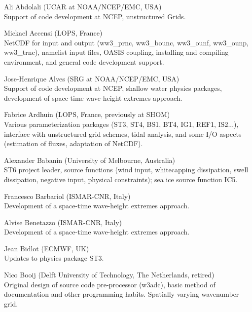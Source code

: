 \begin{list}{\ldots}{ }

\item [Ali Abdolali] (UCAR at NOAA/NCEP/EMC, USA) \\
  Support of code development at NCEP, unstructured Grids.

\item [Mickael Accensi] (LOPS, France) \\
  NetCDF for input and output (ww3\_prnc, ww3\_bounc, ww3\_ounf, ww3\_ounp, ww3\_trnc), namelist input files, OASIS coupling, installing and compiling environment, and general code development support.

\item [Jose-Henrique Alves] (SRG at NOAA/NCEP/EMC, USA) \\
  Support of code development at NCEP, shallow water physics packages, development of space-time wave-height extremes approach.

\item [Fabrice Ardhuin] (LOPS, France, previously at SHOM) \\
  Various parameterization packages (ST3, ST4, BS1, BT4, IG1, REF1, IS2...), interface with unstructured grid schemes, tidal analysis, and some I/O aspects (estimation of fluxes, adaptation of NetCDF). 

\item [Alexander Babanin] (University of Melbourne, Australia)\\
  ST6 project leader, source functions (wind input, whitecapping dissipation, swell dissipation, negative input, physical constraints); sea ice source function IC5.

\item [Francesco Barbariol] (ISMAR-CNR, Italy) \\
  Development of a space-time wave-height extremes approach.

\item [Alvise Benetazzo] (ISMAR-CNR, Italy) \\
  Development of a space-time wave-height extremes approach.

\item [Jean Bidlot] (ECMWF, UK) \\
  Updates to physics package ST3.

\item [Nico Booij] (Delft University of Technology, The Netherlands, retired) \\
  Original design of source code pre-processor ({\code w3adc}), basic method
  of documentation and other programming habits. Spatially varying wavenumber
  grid.


\end{list}
